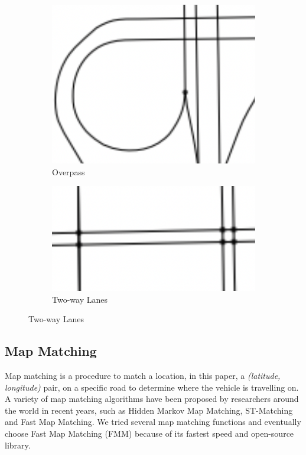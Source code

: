 \begin{figure}[htb]
  \begin{subfigure}[t]{0.22\linewidth}
    \centering
    \includegraphics[width=\textwidth]{images/overpass.png}
    \caption{Overpass}
    \label{fig: overpass}
  \end{subfigure}
  \begin{subfigure}[t]{0.22\linewidth}
    \centering
    \includegraphics[width=\textwidth]{images/two-way.png}
    \caption{Two-way Lanes}
    \label{fig: two-way}
  \end{subfigure}
\end{figure}

\subsection{Map Matching}
Map matching\cite{mm} is a procedure to match a location, in this paper, a \textit{(latitude, longitude)} pair, on a specific road to determine where the vehicle is travelling on. A variety of map matching algorithms have been proposed by researchers around the world in recent years, such as Hidden Markov Map Matching\cite{HMMM}, ST-Matching\cite{stmm} and Fast Map Matching\cite{fmm}. We tried several map matching functions and eventually choose Fast Map Matching (FMM) because of its fastest speed and open-source library.

